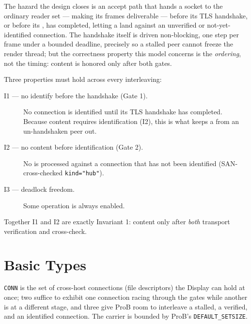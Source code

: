 \documentclass[a4paper,10pt,fleqn]{article}
\begin{document}
The hazard the design closes is an accept path that hands a socket to the
ordinary reader set --- making its frames deliverable --- before its TLS
handshake, or before its , has completed, letting a
 land against an unverified or not-yet-identified
connection.  The handshake itself is driven non-blocking, one step per
frame under a bounded deadline, precisely so a stalled peer cannot freeze
the render thread; but the correctness property this model concerns is
the \emph{ordering}, not the timing: content is honored only after both
gates.

Three properties must hold across every interleaving:

\begin{description}
  \item[I1 --- no identify before the handshake (Gate 1).] No connection
    is identified until its TLS handshake has completed.  Because content
    requires identification (I2), this is what keeps a 
    from an un-handshaken peer out.
  \item[I2 --- no content before identification (Gate 2).] No
     is processed against a connection that has not
    been identified (SAN-cross-checked \texttt{kind="hub"}).
  \item[I3 --- deadlock freedom.] Some operation is always enabled.
\end{description}

Together I1 and I2 are exactly Invariant 1: content only after \emph{both}
transport verification and  cross-check.

\section{Basic Types}

\begin{zed}
  [CONN]
\end{zed}

\texttt{CONN} is the set of cross-host connections (file descriptors) the
Display can hold at once; two suffice to exhibit one connection racing
through the gates while another is at a different stage, and three give
ProB room to interleave a stalled, a verified, and an identified
connection.  The carrier is bounded by ProB's \texttt{DEFAULT\_SETSIZE}.

\end{document}

